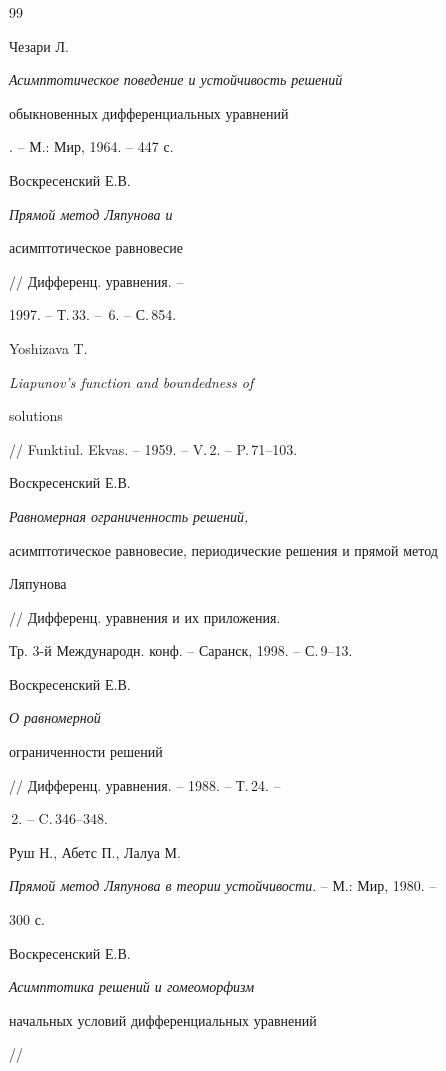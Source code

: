 \begin{thebibliography}{99}


Чезари Л. {\em Асимптотическое поведение и устойчивость решений


обыкновенных дифференциальных уравнений}. -- М.: Мир, 1964. -- 447 с.







Воскресенский Е.В. {\em Прямой метод Ляпунова и


асимптотическое равновесие} // Дифференц. уравнения. --


1997. -- Т.\,33. -- \No\,6. -- С.\,854. 







Yoshizava T. {\em Liapunov's function and boundedness of


solutions} // Funktiul. Ekvas. -- 1959. -- V.\,2. -- P.\,71--103.







Воскресенский Е.В. {\em Равномерная ограниченность решений,


асимптотическое равновесие, периодические решения и прямой метод


Ляпунова} // Дифференц. уравнения и их приложения.


Тр. 3-й Международн. конф. -- Саранск, 1998. -- С.\,9--13.







Воскресенский Е.В. {\em О равномерной


ограниченности решений} // Дифференц. уравнения. -- 1988. -- Т.\,24. --


\No\,2. -- C.\,346--348.







Руш Н., Абетс П., Лалуа М.


{\em Прямой метод Ляпунова в теории устойчивости}. -- М.: Мир, 1980. --


300 с.







Воскресенский Е.В. {\em Асимптотика решений и гомеоморфизм


начальных условий дифференциальных уравнений} //



\end{thebibliography}
